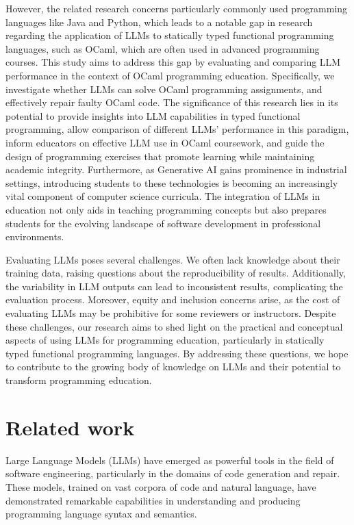 \documentclass[sigconf,authordraft]{acmart}
\begin{document}
However, the related research concerns particularly commonly used programming languages like Java and Python, which leads to a notable gap in research regarding the application of LLMs to statically typed functional programming languages, such as OCaml, which are often used in advanced programming courses. This study aims to address this gap by evaluating and comparing LLM performance in the context of OCaml programming education. Specifically, we investigate whether LLMs can solve OCaml programming assignments, and effectively repair faulty OCaml code. The significance of this research lies in its potential to provide insights into LLM capabilities in typed functional programming, allow comparison of different LLMs' performance in this paradigm, inform educators on effective LLM use in OCaml coursework, and guide the design of programming exercises that promote learning while maintaining academic integrity. Furthermore, as Generative AI gains prominence in industrial settings, introducing students to these technologies is becoming an increasingly vital component of computer science curricula. The integration of LLMs in education not only aids in teaching programming concepts but also prepares students for the evolving landscape of software development in professional environments.



Evaluating LLMs poses several challenges. We often lack knowledge about their training data, raising questions about the reproducibility of results. Additionally, the variability in LLM outputs can lead to inconsistent results, complicating the evaluation process. Moreover, equity and inclusion concerns arise, as the cost of evaluating LLMs may be prohibitive for some reviewers or instructors. Despite these challenges, our research aims to shed light on the practical and conceptual aspects of using LLMs for programming education, particularly in statically typed functional programming languages. By addressing these questions, we hope to contribute to the growing body of knowledge on LLMs and their potential to transform programming education.



\section{Related work}

Large Language Models (LLMs) have emerged as powerful tools in the field of software engineering, particularly in the domains of code generation and repair. These models, trained on vast corpora of code and natural language, have demonstrated remarkable capabilities in understanding and producing programming language syntax and semantics.
\end{document}
